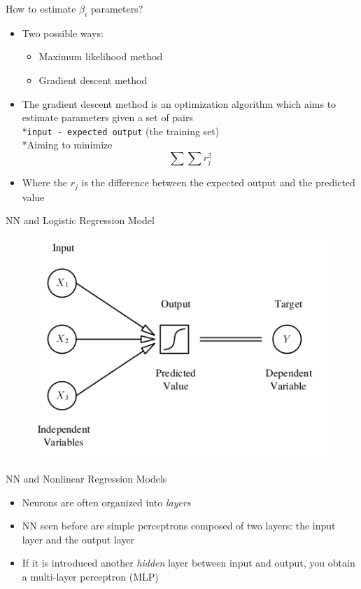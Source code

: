\documentclass[xcolor ={table,usenames,dvipsnames}]{beamer}
\theoremstyle{definition}
\begin{document}
\begin{frame}{How to estimate $\beta_i$ parameters?}
\begin{itemize}
	\item Two possible ways:
	\begin{itemize}
	\item \color{red} Maximum likelihood \color{black} method
	\item \color{red} Gradient descent \color{black} method
	\end{itemize}
	\item The gradient descent method is an optimization algorithm which aims to estimate parameters given a set of pairs\\*\texttt{input - expected output} (the training set)
	\\*Aiming to minimize 	$$
	\sum \sum r_j^2
	$$
	\item	Where the $r_j$ is the difference between the expected output and the predicted value
\end{itemize}
\end{frame}
\begin{frame}{NN and Logistic Regression Model}
	\begin{figure}[h!]
	\centering
	\includegraphics[scale=2.4]{../Relazione/img/logreg}
\end{figure}
\end{frame}
\begin{frame}{NN and Nonlinear Regression Models}
\begin{itemize}
	\item Neurons are often organized into \emph{layers}
	\item NN seen before are simple perceptrons composed of two layers: the input layer and the output layer
	\item If it is introduced another \emph{hidden} layer between input and output, you obtain a multi-layer perceptron (MLP)
\end{itemize}
\end{frame}
\end{document}
